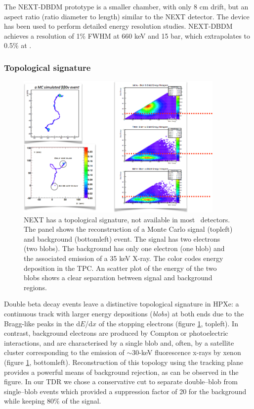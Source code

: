 \documentclass[a4paper,11pt,oneside]{article}
\begin{document}
The NEXT-DBDM prototype is a smaller chamber, with only 8 cm drift, but an aspect ratio (ratio diameter to length) similar to the NEXT detector. The device has been used to perform detailed energy resolution studies. NEXT-DBDM achieves a resolution of 1\% FWHM at 660 keV and 15 bar, which extrapolates to 0.5\% at \Qbb.

\subsubsection*{Topological signature}

\begin{figure}
\centering
\includegraphics[width=0.9\textwidth]{img/Topology.png}
\caption{\small NEXT has a topological signature, not available in most \bbonu\ detectors. The panel shows the reconstruction of a Monte Carlo signal (topleft) and background (bottomleft) event. The signal has two electrons (two blobs). The background has only one electron (one blob) and the associated emission of a 35 keV X-ray. The color codes energy deposition in the TPC. An scatter plot of the energy of the two blobs shows a clear separation between signal and background regions.}\label{fig.ETRK2}
\end{figure}
	
Double beta decay events leave a distinctive topological signature in HPXe: a continuous track with larger energy depositions (\emph{blobs}) at both ends due to the Bragg-like peaks in the d$E$/d$x$ of the stopping electrons (figure \ref{fig.ETRK2}, topleft). In contrast, background electrons are produced by Compton or photoelectric interactions, and are characterised by a single blob and, often, by a satellite cluster corresponding to the emission of $\sim30$-keV fluorescence x-rays by xenon (figure \ref{fig.ETRK2}, bottomleft).
Reconstruction of this topology using the tracking plane provides a powerful means of background rejection, as can be observed in the figure. In our TDR we chose a conservative cut to separate double--blob from single--blob events which provided a suppression factor of 20 for the background while keeping 80\% of the signal.  
\end{document}
